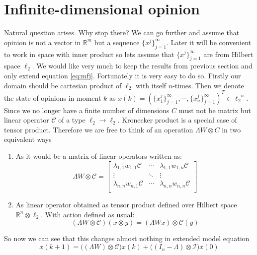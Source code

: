 \documentclass[leqno,12pt]{amsart}
\theoremstyle{remark}
\theoremstyle{remark}
\theoremstyle{remark}
\theoremstyle{definition}
\numberwithin{equation}{section}
\newcommand{\R}{\ensuremath{\mathbb{R}}}
\begin{document}
\section{Infinite-dimensional opinion}
Natural question arises. Why stop there? We can go further and assume that opinion is not a vector in $\R^m$ but a sequence $\{x^j\}_{j=1}^\infty$. Later it will be convenient to work in space with inner product so lets assume that $\{x^j\}_{j=1}^\infty$ are from Hilbert space $\ell_2$. We would like very much to keep the results from previous section and only extend equation \ref{eq:mfj}. Fortunately it is very easy to do so. 
Firstly our domain should be cartesian product of $\ell_2$ with itself $n$-times.  Then we denote the state of opinions in moment $k$ as $x(k) = (\{x_1^j\}_{j=1}^\infty, \cdots ,\{x_n^j\}_{j=1}^\infty)^T \in {\ell_2}^n$.
Since we no longer have a finite number of dimensions $C$ must not be matrix but linear operator $\mathcal{C}$ of a type $\ell_2 \to \ell_2$. Kronecker product is a special case of tensor product. Therefore we are free to think of an operation $\Lambda W \otimes C$ in two equivalent ways
\begin{enumerate}
    \item As it would be a matrix of linear operators written as:
    \begin{equation*}\label{eq:1form}
        \Lambda W \otimes \mathcal{C} = \begin{bmatrix} 
            \lambda_{1,1}w_{1,1}\mathcal{C} & \cdots & \lambda_{1,1}w_{1,n}\mathcal{C} \\
            \vdots & \ddots & \vdots\\
            \lambda_{n,n}w_{n,1}\mathcal{C} & \cdots & \lambda_{n,n}w_{n,n}\mathcal{C} \\
            \end{bmatrix}
    \end{equation*}
    \item As linear operator obtained as tensor product defined over Hilbert space $\R^n\otimes \ell_2$. With action defined as usual:
    \begin{equation*}
        (\Lambda W \otimes \mathcal{C})(x\otimes y) = (\Lambda Wx) \otimes \mathcal{C}(y)
    \end{equation*}
\end{enumerate}
So now we can see that this changes almost nothing in extended model equation
\begin{equation}\label{eq:model}
    x(k+1) = \big((\Lambda W)\otimes \mathcal{C}\big)x(k) + \big((I_n - \Lambda)\otimes \mathcal{I}\big)x(0)
\end{equation}
\end{document}
